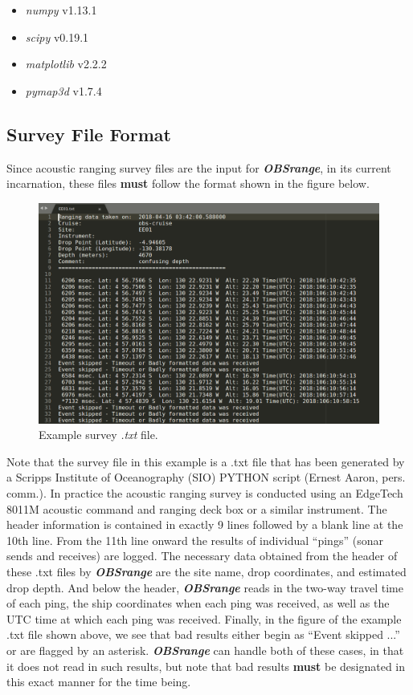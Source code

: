 \documentclass[titlepage]{article}
\begin{document}
  \begin{itemize}
   \item \textit{numpy} v1.13.1
   \item \textit{scipy} v0.19.1
   \item \textit{matplotlib} v2.2.2
   \item \textit{pymap3d} v1.7.4
  \end{itemize}

  \subsection{Survey File Format}
  Since acoustic ranging survey files are the input for \textit{\textbf{OBSrange}}, in its current incarnation, these files \textbf{must} follow the format shown in the figure below.\\

  \begin{figure}[h]
    \includegraphics[width=\linewidth]{survey_fle_ex.png}
    \caption{Example survey \textit{.txt} file.}
  \end{figure}

  Note that the survey file in this example is a .txt file that has been generated by a Scripps Institute of Oceanography (SIO) PYTHON script (Ernest Aaron, pers. comm.). In practice the acoustic ranging survey is conducted using an EdgeTech 8011M acoustic command and ranging deck box or a similar instrument. The header information is contained in exactly 9 lines followed by a blank line at the 10th line. From the 11th line onward the results of individual “pings” (sonar sends and receives) are logged. The necessary data obtained from the header of these .txt files by \textit{\textbf{OBSrange}} are the site name, drop coordinates, and estimated drop depth. And below the header, \textit{\textbf{OBSrange}} reads in the two-way travel time of each ping, the ship coordinates when each ping was received, as well as the UTC time at which each ping was received. Finally, in the figure of the example .txt file shown above, we see that bad results either begin as “Event skipped ...” or are flagged by an asterisk. \textit{\textbf{OBSrange}} can handle both of these cases, in that it does not read in such results, but note that bad results \textbf{must} be designated in this exact manner for the time being. 
  
\end{document}
